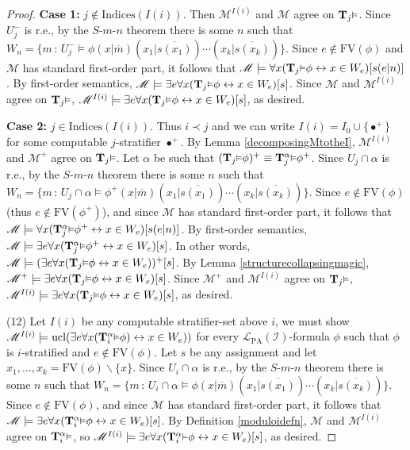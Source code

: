 \documentclass[reqno]{article}
\theoremstyle{definition}
\def\L{\mathscr{L}}
\def\M{\mathscr{M}}
\def\T{\mathbf{T}}
\def\indices{\mathrm{Indices}}
\def\FV{\mathrm{FV}}
\def\LPA{\L_{\mathrm{PA}}}
\def\indset{\mathcal I}
\renewcommand{\Pr}[1]{\T_{#1}\mbox{\small${\vDash}$}}
\newcommand{\Prr}[2]{\T^{#1}_{#2}\mbox{\small${\vDash}$}}
\newcommand{\ucl}[1]{\mathrm{ucl}(#1)}
\newcommand{\case}[1]{\textbf{Case #1:}}
\begin{document}
\begin{proof}
\item
\case1
$j\not\in \indices(I(i))$.
Then $\M^{I(i)}$ and $\M$ agree on $\Pr j$.
Since $U^-_j$ is r.e., by the $S$-$m$-$n$ theorem there is some $n$ such that
$W_n=\{m\,:\,U^-_j\models \phi(x|\overline m)(x_1|\overline{s(x_1)})\cdots
(x_k|\overline{s(x_k)})\}$.
Since $e\not\in\FV(\phi)$ and $\M$ has standard first-order part, it follows
that $\M\models \forall x(\Pr j \phi\leftrightarrow x\in W_e)[s(e|n)]$.
By first-order semantics,
$\M\models \exists e\forall x(\Pr j\phi\leftrightarrow x\in W_e)[s]$.
Since $\M$ and $\M^{I(i)}$ agree on $\Pr j$,
$\M^{I(i)}\models \exists e\forall x(\Pr j\phi\leftrightarrow x\in W_e)[s]$,
as desired.

\item
\case2
$j\in\indices(I(i))$.
Thus $i\prec j$ and we can write $I(i)=I_0\cup\{\bullet^+\}$
for some computable $j$-stratifier $\bullet^+$.
By Lemma \ref{decomposingMtotheI}, $\M^{I(i)}$ and
$\M^+$ agree on $\Pr j$.
Let $\alpha$ be such that $(\Pr j\phi)^+\equiv \Prr\alpha j\phi^+$.
Since $U_j\cap\alpha$ is r.e., by the $S$-$m$-$n$ theorem there is some $n$ such that
$W_n=\{m\,:\,U_j\cap\alpha\models\phi^+(x|\overline m)(x_1|\overline{s(x_1)})\cdots
(x_k|\overline{s(x_k)})\}$.
Since $e\not\in\FV(\phi)$ (thus $e\not\in\FV(\phi^+)$), and since $\M$ has standard
first-order part, it follows that
$\M\models \forall x(\Prr\alpha j\phi^+\leftrightarrow x\in W_e)[s(e|n)]$.
By first-order semantics,
$\M\models\exists e\forall x(\Prr\alpha j\phi^+\leftrightarrow x\in W_e)[s]$.
In other words,
$\M\models(\exists e\forall x(\Pr j\phi\leftrightarrow x\in W_e))^+[s]$.
By Lemma \ref{structurecollapsingmagic},
$\M^+\models \exists e\forall x(\Pr j\phi\leftrightarrow x\in W_e)[s]$.
Since $\M^+$ and $\M^{I(i)}$ agree on $\Pr j$,
$\M^{I(i)}\models \exists e\forall x(\Pr j\phi\leftrightarrow x\in W_e)[s]$,
as desired.

\item
(12)
Let $I(i)$ be any computable stratifier-set above $i$,
we must show $\M^{I(i)}\models\ucl{\exists e\forall x(\Prr\alpha i \phi)\leftrightarrow
x\in W_e)}$ for every $\LPA(\indset)$-formula $\phi$ such that
$\phi$ is $i$-stratified and $e\not\in\FV(\phi)$.
Let $s$ be any assignment
and let $x_1,\ldots,x_k=\FV(\phi)\backslash \{x\}$.
Since $U_i\cap\alpha$ is r.e., by the $S$-$m$-$n$ theorem there is some $n$
such that
$W_n=\{m\,:\,U_i\cap\alpha\models \phi(x|\overline m)(x_1|\overline{s(x_1)})\cdots
(x_k|\overline{s(x_k)})\}$.
Since $e\not\in\FV(\phi)$, and since $\M$ has standard first-order part,
it follows that
$\M\models \exists e\forall x(\Prr\alpha i\phi \leftrightarrow x\in W_e)[s]$.
By Definition \ref{moduloidefn}, $\M$ and $\M^{I(i)}$ agree on $\Prr\alpha i$,
so $\M^{I(i)}\models \exists e\forall x(\Prr\alpha i\phi \leftrightarrow x\in W_e)[s]$,
as desired.



\end{proof}
\end{document}
